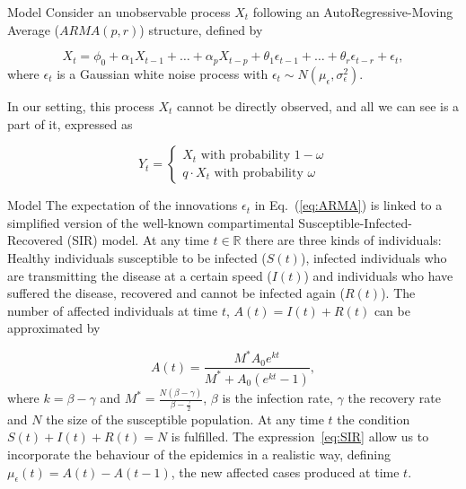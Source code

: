 \documentclass[
    10pt,
    aspectratio=169,
    usenames,
    dvipsnames
]{beamer}
\begin{document}
\begin{frame}{Model}
 Consider an unobservable process $X_t$ following an AutoRegressive-Moving Average ($ARMA(p, r)$) structure, defined by

\begin{equation}\label{eq:ARMA}
  X_t = \phi_0 + \alpha_1 X_{t-1} + \ldots + \alpha_p X_{t-p} + \theta_1 \epsilon_{t-1} + \ldots + \theta_r \epsilon_{t-r} + \epsilon_t,
\end{equation}
where $\epsilon_t$ is a Gaussian white noise process with $\epsilon_t \sim N(\mu_{\epsilon}, \sigma_{\epsilon}^2)$.

In our setting, this process $X_t$ cannot be directly observed, and all we can see is a part of it, expressed as

\begin{equation}\label{eq:model}
    Y_t=\left\{
                \begin{array}{ll}
                  X_t \text{ with probability } 1-\omega \\
                  q \cdot X_t \text{ with probability } \omega
                \end{array}
              \right.
\end{equation}
\end{frame}

\begin{frame}{Model}
The expectation of the innovations $\epsilon_t$ in Eq.~(\ref{eq:ARMA}) is linked to a simplified version of the well-known compartimental Susceptible-Infected-Recovered (SIR) model. At any time $t \in \mathbb{R}$ there are three kinds of individuals: Healthy individuals susceptible to be infected ($S(t)$), infected individuals who are transmitting the disease at a certain speed ($I(t)$) and individuals who have suffered the disease, recovered and cannot be infected again ($R(t)$). The number of affected individuals at time $t$, $A(t) = I(t) + R(t)$ can be approximated by

\begin{equation}\label{eq:SIR}
 A(t) = \frac{M^{*} A_0 e^{kt}}{M^{*}+A_0(e^{kt}-1)},
\end{equation}
where $k = \beta - \gamma$ and $M^{*} = \frac{N(\beta - \gamma)}{\beta - \frac{\gamma}{2}}$, $\beta$ is the infection rate, $\gamma$ the recovery rate and $N$ the size of the susceptible population. At any time $t$ the condition $S(t) + I(t) + R(t) = N$ is fulfilled. The expression~\ref{eq:SIR} allow us to incorporate the behaviour of the epidemics in a realistic way, defining $\mu_{\epsilon}(t) = A(t) - A(t-1)$, the new affected cases produced at time $t$.
\end{frame}
\end{document}

